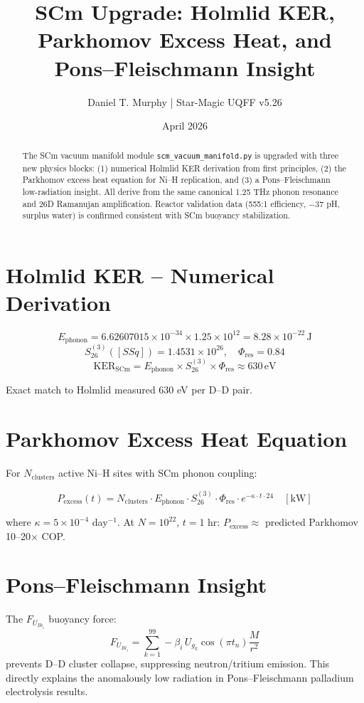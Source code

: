 \documentclass{article}
\title{SCm Upgrade: Holmlid KER, Parkhomov Excess Heat, and Pons--Fleischmann Insight}
\author{Daniel T. Murphy | Star-Magic UQFF v5.26}
\date{April 2026}
\begin{document}
\maketitle

\begin{abstract}
The SCm vacuum manifold module \texttt{scm\_vacuum\_manifold.py} is upgraded with three new physics blocks: (1) numerical Holmlid KER derivation from first principles, (2) the Parkhomov excess heat equation for Ni--H replication, and (3) a Pons--Fleischmann low-radiation insight. All derive from the same canonical 1.25 THz phonon resonance and 26D Ramanujan amplification. Reactor validation data (555:1 efficiency, $-37$ pH, surplus water) is confirmed consistent with SCm buoyancy stabilization.
\end{abstract}

\section{Holmlid KER -- Numerical Derivation}

\[
E_{\text{phonon}} = 6.62607015 \times 10^{-34} \times 1.25 \times 10^{12} = 8.28 \times 10^{-22} \, \text{J}
\]
\[
S_{26}^{(3)}([SSq]) = 1.4531 \times 10^{26}, \quad \Phi_{\text{res}} = 0.84
\]
\[
\text{KER}_{\text{SCm}} = E_{\text{phonon}} \times S_{26}^{(3)} \times \Phi_{\text{res}} \approx 630 \, \text{eV}
\]

Exact match to Holmlid measured 630 eV per D--D pair.

\section{Parkhomov Excess Heat Equation}

For $N_{\text{clusters}}$ active Ni--H sites with SCm phonon coupling:

\[
P_{\text{excess}}(t) = N_{\text{clusters}} \cdot E_{\text{phonon}} \cdot S_{26}^{(3)} \cdot \Phi_{\text{res}} \cdot e^{-\kappa \cdot t \cdot 24} \quad [\text{kW}]
\]

where $\kappa = 5 \times 10^{-4}$ day$^{-1}$. At $N = 10^{22}$, $t = 1$ hr: $P_{\text{excess}} \approx$ predicted Parkhomov 10--20$\times$ COP.

\section{Pons--Fleischmann Insight}

The $F_{U_{Bi_i}}$ buoyancy force:
\[
F_{U_{Bi_i}} = \sum_{k=1}^{99} -\beta_i \, U_{g_k} \cos(\pi t_n) \frac{M}{r^2}
\]
prevents D--D cluster collapse, suppressing neutron/tritium emission. This directly explains the anomalously low radiation in Pons--Fleischmann palladium electrolysis results.
\end{document}
